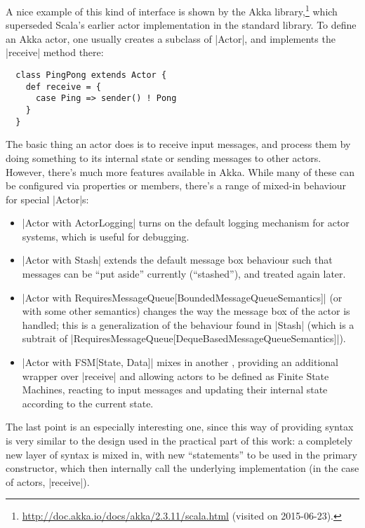 A nice example of this kind of interface is shown by the Akka
library,\footnote{\protect\url{http://doc.akka.io/docs/akka/2.3.11/scala.html} (visited on
  2015-06-23).} which superseded Scala's earlier actor implementation in the standard library. To
define an Akka actor, one usually creates a subclass of |Actor|, and implements the |receive| method
there:
\begin{lstlisting}
  class PingPong extends Actor {
    def receive = {
      case Ping => sender() ! Pong
    }
  }

\end{lstlisting}

The basic thing an actor does is to receive input messages, and process them by doing something to
its internal state or sending messages to other actors. However, there's much more features
available in Akka. While many of these can be configured via properties or members, there's a range
of mixed-in behaviour for special |Actor|s:
\begin{itemize}
\item |Actor with ActorLogging| turns on the default logging mechanism for actor
  systems, which is useful for debugging.
\item |Actor with Stash| extends the default message box behaviour such that messages can be
  \enquote{put aside} currently (\enquote{stashed}), and treated again later.
\item |Actor with RequiresMessageQueue[BoundedMessageQueueSemantics]| (or with some other semantics)
  changes the way the message box of the actor is handled; this is a generalization of the behaviour
  found in |Stash| (which is a subtrait of |RequiresMessageQueue[DequeBasedMessageQueueSemantics]|).
\item |Actor with FSM[State, Data]| mixes in another \dsl{}, providing an additional wrapper over
  |receive| and allowing actors to be defined as Finite State Machines, reacting to input messages
  and updating their internal state according to the current state.
\end{itemize}
The last point is an especially interesting one, since this way of providing \dsl{} syntax is very
similar to the design used in the practical part of this work: a completely new layer of syntax is
mixed in, with new \enquote{statements} to be used in the primary constructor, which then internally
call the underlying implementation (in the case of actors, |receive|).


